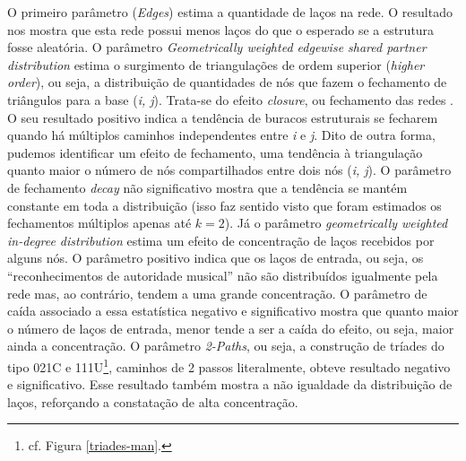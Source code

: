\documentclass[a4paper, 12pt, openright, oneside, german, french, english, brazil]{abntex2}
\begin{document}
	
	O primeiro parâmetro (\textit{Edges}) estima a quantidade de laços na rede. O resultado nos mostra que esta rede possui menos laços do que o esperado se a estrutura fosse aleatória. O parâmetro \textit{Geometrically weighted edgewise shared partner distribution} estima o surgimento de triangulações de ordem superior (\textit{higher order}), ou seja, a distribuição de quantidades de nós que fazem o fechamento de triângulos para a base (\textit{i, j}). Trata-se do efeito \textit{closure}, ou fechamento das redes \cite{robins2007introduction}. O seu resultado positivo indica a tendência de buracos estruturais se fecharem quando há múltiplos caminhos independentes entre \textit{i} e \textit{j}. Dito de outra forma, pudemos identificar um efeito de fechamento, uma tendência à triangulação quanto maior o número de nós compartilhados entre dois nós (\textit{i, j}). O parâmetro de fechamento \textit{decay} não significativo mostra que a tendência se mantém constante em toda a distribuição (isso faz sentido visto que foram estimados os fechamentos múltiplos apenas até $k = 2$). Já o parâmetro \textit{geometrically weighted in-degree distribution} estima um efeito de concentração de laços recebidos por alguns nós. O parâmetro positivo indica que os laços de entrada, ou seja, os ``reconhecimentos de autoridade musical'' não são distribuídos igualmente pela rede mas, ao contrário, tendem a uma grande concentração. O parâmetro de caída associado a essa estatística negativo e significativo mostra que quanto maior o número de laços de entrada, menor tende a ser a caída do efeito, ou seja, maior ainda a concentração. O parâmetro \textit{2-Paths}, ou seja, a construção de tríades do tipo 021C e 111U\footnote{cf. Figura \ref{triades-man}.}, caminhos de 2 passos literalmente, obteve resultado negativo e significativo. Esse resultado também mostra a não igualdade da distribuição de laços, reforçando a constatação de alta concentração.
	
\end{document}
